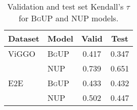 \begin{table}
\centering

\begin{tabular}{ll c c}
\toprule
Dataset & Model & Valid & Test \\
\midrule
ViGGO & \textsc{BgUP} & 0.417 & 0.347 \\
                       & \textsc{NUP} & 0.739 & 0.651 \\
\midrule
E2E & \textsc{BgUP} & 0.433 & 0.432 \\
                       & \textsc{NUP} & 0.502 & 0.447 \\
\bottomrule
\end{tabular}


\caption{Validation and test set Kendall's $\tau$ for \textsc{BgUP} and 
NUP models.}
\label{tab:uptau}
\end{table}
